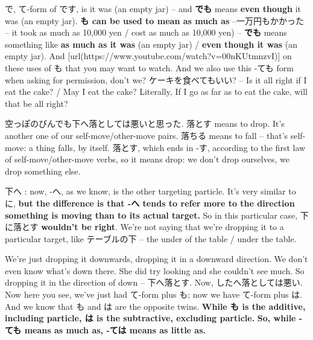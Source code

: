 {}

で, て-form of です, is it was (an empty jar) -- and {\bf でも} means {\bf even though} it was (an empty jar). {\bf も can be used to mean as much as} --一万円もかかった -- it took as much as 10,000 yen / cost as much as 10,000 yen) -- {\bf でも} means something like {\bf as much as it was} (an empty jar) / {\bf even though it was} (an empty jar). And [url(https://www.youtube.com/watch?v=00nKUtmnzvI)] on these uses of も that you may want to watch. And we also use this -ても form when asking for permission, don't we? ケーキを食べてもいい? -- Is it all right if I eat the cake? / May I eat the cake? Literally, If I go as far as to eat the cake, will that be all right?

\thinrule

空っぽのびんでも下へ落としては悪いと思った. 落とす means to drop. It's another one of our self-move/other-move pairs. 落ちる means to fall -- that's self-move: a thing falls, by itself. 落とす, which ends in -す, according to the first law of self-move/other-move verbs, so it means drop: we don't drop ourselves, we drop something else.

{}

下へ : now, -へ, as we know, is the other targeting particle. It's very similar to に, {\bf but the difference is that -へ tends to refer more to the direction} {\bf something is moving than to its actual target.} So in this particular case, 下に落とす {\bf wouldn't be right}. We're not saying that we're dropping it to a particular target, like テーブルの下 -- the under of the table / under the table.

{}

We're just dropping it downwards, dropping it in a downward direction. We don't even know what's down there. She did try looking and she couldn't see much. So dropping it in the direction of down -- 下へ落とす. Now, したへ落としては悪い. Now here you see, we've just had て-form plus も; now we have て-form plus は. And we know that も and は are the opposite twins. {\bf While も is the additive, including particle, は is the subtractive, excluding particle.} {\bf So, while -ても means as much as, -ては means as little as.}

\stopsectionlevel

\startsectionlevel[title={ては},reference={ては}]

